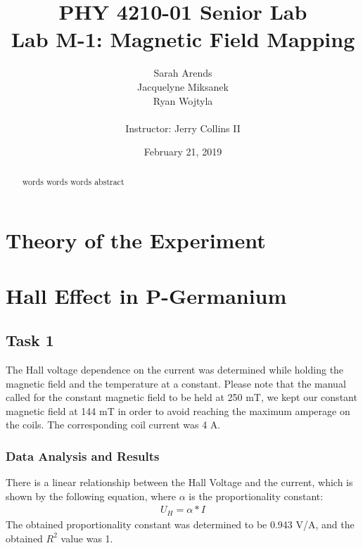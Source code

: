 \documentclass[a4paper]{article}
\title{PHY 4210-01 Senior Lab \\Lab M-1: Magnetic Field Mapping}
\author{Sarah Arends \\
        Jacquelyne Miksanek \\
        Ryan Wojtyla \\ \\
        Instructor: Jerry Collins II}
\date{February 21, 2019}
\begin{document}
\maketitle

\begin{abstract}
\qq words words words abstract
\end{abstract}

\newpage

\setcounter{tocdepth}{2}
\tableofcontents

\newpage

\section{Theory of the Experiment}

\section{Hall Effect in P-Germanium}

\subsection{Task 1}

\qq The Hall voltage dependence on the current was determined while
holding the magnetic field and the temperature at a constant. Please
note that the manual called for the constant magnetic field to be held
at 250 mT, we kept our constant magnetic field at 144 mT in order to
avoid reaching the maximum amperage on the coils. The corresponding
coil current was 4 A.

\subsubsection{Data Analysis and Results}
There is a linear relationship between the Hall Voltage and the
current, which is shown by the following equation, where $\alpha$ is
the proportionality constant:
\begin{align*}
U_H = \alpha * I
\end{align*}
The obtained proportionality constant was determined to be 0.943 V/A,
and the obtained $R^2$ value was 1.
\end{document}
